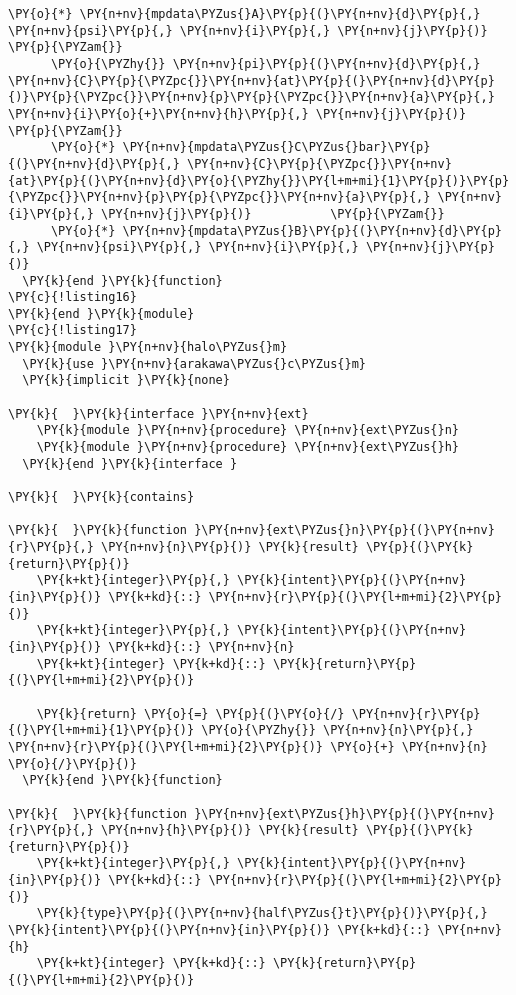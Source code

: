 \begin{Verbatim}[commandchars=\\\{\}]
      \PY{o}{*} \PY{n+nv}{mpdata\PYZus{}A}\PY{p}{(}\PY{n+nv}{d}\PY{p}{,} \PY{n+nv}{psi}\PY{p}{,} \PY{n+nv}{i}\PY{p}{,} \PY{n+nv}{j}\PY{p}{)}                         \PY{p}{\PYZam{}}
      \PY{o}{\PYZhy{}} \PY{n+nv}{pi}\PY{p}{(}\PY{n+nv}{d}\PY{p}{,} \PY{n+nv}{C}\PY{p}{\PYZpc{}}\PY{n+nv}{at}\PY{p}{(}\PY{n+nv}{d}\PY{p}{)}\PY{p}{\PYZpc{}}\PY{n+nv}{p}\PY{p}{\PYZpc{}}\PY{n+nv}{a}\PY{p}{,} \PY{n+nv}{i}\PY{o}{+}\PY{n+nv}{h}\PY{p}{,} \PY{n+nv}{j}\PY{p}{)}                     \PY{p}{\PYZam{}}
      \PY{o}{*} \PY{n+nv}{mpdata\PYZus{}C\PYZus{}bar}\PY{p}{(}\PY{n+nv}{d}\PY{p}{,} \PY{n+nv}{C}\PY{p}{\PYZpc{}}\PY{n+nv}{at}\PY{p}{(}\PY{n+nv}{d}\PY{o}{\PYZhy{}}\PY{l+m+mi}{1}\PY{p}{)}\PY{p}{\PYZpc{}}\PY{n+nv}{p}\PY{p}{\PYZpc{}}\PY{n+nv}{a}\PY{p}{,} \PY{n+nv}{i}\PY{p}{,} \PY{n+nv}{j}\PY{p}{)}           \PY{p}{\PYZam{}}
      \PY{o}{*} \PY{n+nv}{mpdata\PYZus{}B}\PY{p}{(}\PY{n+nv}{d}\PY{p}{,} \PY{n+nv}{psi}\PY{p}{,} \PY{n+nv}{i}\PY{p}{,} \PY{n+nv}{j}\PY{p}{)}
  \PY{k}{end }\PY{k}{function}
\PY{c}{!listing16}
\PY{k}{end }\PY{k}{module}
\PY{c}{!listing17}
\PY{k}{module }\PY{n+nv}{halo\PYZus{}m}
  \PY{k}{use }\PY{n+nv}{arakawa\PYZus{}c\PYZus{}m}
  \PY{k}{implicit }\PY{k}{none}

\PY{k}{  }\PY{k}{interface }\PY{n+nv}{ext}
    \PY{k}{module }\PY{n+nv}{procedure} \PY{n+nv}{ext\PYZus{}n}
    \PY{k}{module }\PY{n+nv}{procedure} \PY{n+nv}{ext\PYZus{}h}
  \PY{k}{end }\PY{k}{interface }

\PY{k}{  }\PY{k}{contains}

\PY{k}{  }\PY{k}{function }\PY{n+nv}{ext\PYZus{}n}\PY{p}{(}\PY{n+nv}{r}\PY{p}{,} \PY{n+nv}{n}\PY{p}{)} \PY{k}{result} \PY{p}{(}\PY{k}{return}\PY{p}{)}
    \PY{k+kt}{integer}\PY{p}{,} \PY{k}{intent}\PY{p}{(}\PY{n+nv}{in}\PY{p}{)} \PY{k+kd}{::} \PY{n+nv}{r}\PY{p}{(}\PY{l+m+mi}{2}\PY{p}{)}
    \PY{k+kt}{integer}\PY{p}{,} \PY{k}{intent}\PY{p}{(}\PY{n+nv}{in}\PY{p}{)} \PY{k+kd}{::} \PY{n+nv}{n}
    \PY{k+kt}{integer} \PY{k+kd}{::} \PY{k}{return}\PY{p}{(}\PY{l+m+mi}{2}\PY{p}{)}
    
    \PY{k}{return} \PY{o}{=} \PY{p}{(}\PY{o}{/} \PY{n+nv}{r}\PY{p}{(}\PY{l+m+mi}{1}\PY{p}{)} \PY{o}{\PYZhy{}} \PY{n+nv}{n}\PY{p}{,} \PY{n+nv}{r}\PY{p}{(}\PY{l+m+mi}{2}\PY{p}{)} \PY{o}{+} \PY{n+nv}{n} \PY{o}{/}\PY{p}{)}
  \PY{k}{end }\PY{k}{function}

\PY{k}{  }\PY{k}{function }\PY{n+nv}{ext\PYZus{}h}\PY{p}{(}\PY{n+nv}{r}\PY{p}{,} \PY{n+nv}{h}\PY{p}{)} \PY{k}{result} \PY{p}{(}\PY{k}{return}\PY{p}{)}
    \PY{k+kt}{integer}\PY{p}{,} \PY{k}{intent}\PY{p}{(}\PY{n+nv}{in}\PY{p}{)} \PY{k+kd}{::} \PY{n+nv}{r}\PY{p}{(}\PY{l+m+mi}{2}\PY{p}{)}
    \PY{k}{type}\PY{p}{(}\PY{n+nv}{half\PYZus{}t}\PY{p}{)}\PY{p}{,} \PY{k}{intent}\PY{p}{(}\PY{n+nv}{in}\PY{p}{)} \PY{k+kd}{::} \PY{n+nv}{h}
    \PY{k+kt}{integer} \PY{k+kd}{::} \PY{k}{return}\PY{p}{(}\PY{l+m+mi}{2}\PY{p}{)}
    

\end{Verbatim}
